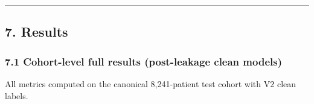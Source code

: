 \documentclass[
  11pt,
]{article}
\begin{document}
\begin{center}\rule{0.5\linewidth}{0.5pt}\end{center}

\subsection{7. Results}\label{results}

\subsubsection{7.1 Cohort-level full results (post-leakage clean
models)}\label{cohort-level-full-results-post-leakage-clean-models}

All metrics computed on the canonical 8,241-patient test cohort with V2
clean labels.
\end{document}
